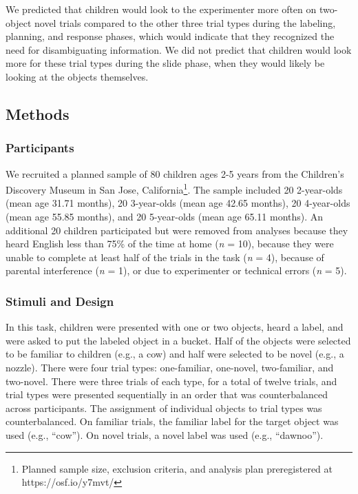 \documentclass[10pt, letterpaper]{article}
\begin{document}
We predicted that children would look to the experimenter more often on
two-object novel trials compared to the other three trial types during
the labeling, planning, and response phases, which would indicate that
they recognized the need for disambiguating information. We did not
predict that children would look more for these trial types during the
slide phase, when they would likely be looking at the objects
themselves.

\subsection{Methods}\label{methods}

\subsubsection{Participants}\label{participants}

We recruited a planned sample of 80 children ages 2-5 years from the
Children's Discovery Museum in San Jose,
California\footnote{Planned sample size, exclusion criteria, and analysis plan preregistered at https://osf.io/y7mvt/}.
The sample included 20 2-year-olds (mean age 31.71 months), 20
3-year-olds (mean age 42.65 months), 20 4-year-olds (mean age 55.85
months), and 20 5-year-olds (mean age 65.11 months). An additional 20
children participated but were removed from analyses because they heard
English less than 75\% of the time at home (\emph{n} = 10), because they
were unable to complete at least half of the trials in the task
(\emph{n} = 4), because of parental interference (\emph{n} = 1), or due
to experimenter or technical errors (\emph{n} = 5).

\subsubsection{Stimuli and Design}\label{stimuli-and-design}

In this task, children were presented with one or two objects, heard a
label, and were asked to put the labeled object in a bucket. Half of the
objects were selected to be familiar to children (e.g., a cow) and half
were selected to be novel (e.g., a nozzle). There were four trial types:
one-familiar, one-novel, two-familiar, and two-novel. There were three
trials of each type, for a total of twelve trials, and trial types were
presented sequentially in an order that was counterbalanced across
participants. The assignment of individual objects to trial types was
counterbalanced. On familiar trials, the familiar label for the target
object was used (e.g., ``cow''). On novel trials, a novel label was used
(e.g., ``dawnoo'').
\end{document}
